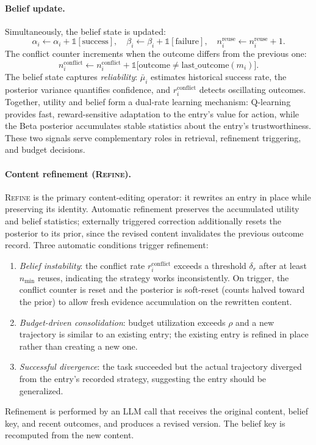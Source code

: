 \paragraph{Belief update.}
Simultaneously, the belief state is updated:
\begin{equation}
\label{eq:belief-update}
  \alpha_i \leftarrow \alpha_i + \mathbb{1}[\text{success}], \quad
  \beta_i  \leftarrow \beta_i  + \mathbb{1}[\text{failure}], \quad
  n_i^{\mathrm{reuse}} \leftarrow n_i^{\mathrm{reuse}} + 1.
\end{equation}
The conflict counter increments when the outcome differs from the previous one:
\begin{equation}
\label{eq:conflict-update}
  n_i^{\mathrm{conflict}} \leftarrow n_i^{\mathrm{conflict}} + \mathbb{1}\!\bigl[\text{outcome} \neq \text{last\_outcome}(m_i)\bigr].
\end{equation}
The belief state captures \emph{reliability}: $\bar{\mu}_i$ estimates historical success rate, the posterior variance quantifies confidence, and $r_i^{\mathrm{conflict}}$ detects oscillating outcomes. Together, utility and belief form a dual-rate learning mechanism: Q-learning provides fast, reward-sensitive adaptation to the entry's value for action, while the Beta posterior accumulates stable statistics about the entry's trustworthiness. These two signals serve complementary roles in retrieval, refinement triggering, and budget decisions.

\paragraph{Content refinement (\textsc{Refine}).}
\textsc{Refine} is the primary content-editing operator: it rewrites an entry in place while preserving its identity. Automatic refinement preserves the accumulated utility and belief statistics; externally triggered correction additionally resets the posterior to its prior, since the revised content invalidates the previous outcome record. Three automatic conditions trigger refinement:
\begin{enumerate}
  \item \emph{Belief instability}: the conflict rate $r_i^{\mathrm{conflict}}$ exceeds a threshold $\delta_r$ after at least $n_{\min}$ reuses, indicating the strategy works inconsistently. On trigger, the conflict counter is reset and the posterior is soft-reset (counts halved toward the prior) to allow fresh evidence accumulation on the rewritten content.
  \item \emph{Budget-driven consolidation}: budget utilization exceeds $\rho$ and a new trajectory is similar to an existing entry; the existing entry is refined in place rather than creating a new one.
  \item \emph{Successful divergence}: the task succeeded but the actual trajectory diverged from the entry's recorded strategy, suggesting the entry should be generalized.
\end{enumerate}
Refinement is performed by an LLM call that receives the original content, belief key, and recent outcomes, and produces a revised version. The belief key is recomputed from the new content.

